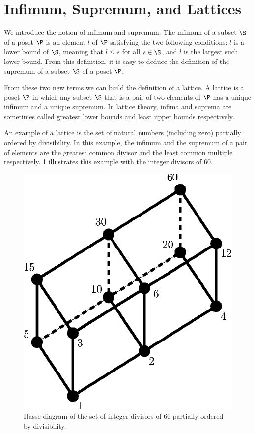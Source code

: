 \section{Infimum, Supremum, and Lattices}
\label{tree:poset:lattices}

We introduce the notion of infimum and supremum. The infimum of a
subset \(\S\) of a poset \(\P\) is an element \(l\) of \(\P\) satisfying the two
following conditions: \(l\) is a lower bound of \(\S\), meaning that \(l \le
s\) for all \(s \in \S\), and \(l\) is the largest such lower bound. From this
definition, it is easy to deduce the definition of the supremum of a subset
\(\S\) of a poset \(\P\).

From these two new terms we can build the definition of a lattice. A
lattice is a poset \(\P\) in which any subset \(\S\) that is a pair of two
elements of \(\P\) has a unique infimum and a unique supremum. In lattice
theory, infima and suprema are sometimes called greatest lower bounds and least
upper bounds respectively.

An example of a lattice is the set of natural numbers (including zero)
partially ordered by divisibility. In this example, the infimum and the
supremum of a pair of elements are the greatest common divisor and the least
common multiple respectively. \ref{fig:poset:lattice:60div} illustrates this
example with the integer divisors of \(60\).

\begin{figure}
\center
\includegraphics[height=0.2\textheight]{fig/poset/lattice/60div}
\caption{Hasse diagram of the set of integer divisors of \(60\) partially ordered by
divisibility.}\label{fig:poset:lattice:60div}
\end{figure}
